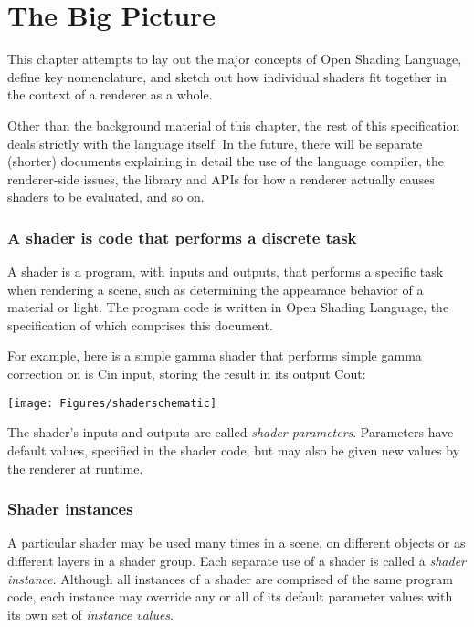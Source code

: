 \documentclass[11pt,letterpaper]{book}
\def\langname{Open Shading Language\xspace}
\begin{document}
\chapter{The Big Picture}
\label{chap:shaderstructure}
\label{chap:bigpicture}

This chapter attempts to lay out the major concepts of \langname,
define key nomenclature, and sketch out how individual shaders fit 
together in the context of a renderer as a whole.

\begin{annotate}
Other than the background material of this chapter, the rest of this
specification deals strictly with the language itself.  In the future, 
there will be separate (shorter) documents explaining in detail the use
of the language compiler, the renderer-side issues, the library and APIs
for how a renderer actually causes shaders to be evaluated, and so on.
\end{annotate}

\subsection*{A shader is code that performs a discrete task}

A shader is a program, with inputs and outputs, that performs a specific
task when rendering a scene, such as determining the appearance behavior
of a material or light.  The program code is written in \langname, the
specification of which comprises this document.

For example, here is a simple {\cf gamma} shader that performs
simple gamma correction on is {\cf Cin} input, storing the result
in its output {\cf Cout}:
\bigskip

\texttt{[image: Figures/shaderschematic]}

\medskip

The shader's inputs and outputs are called \emph{shader parameters}.  
Parameters have default values, specified in the shader code, but may
also be given new values by the renderer at runtime.  

\subsection*{Shader instances}

A particular shader may be used many times in a scene, on different
objects or as different layers in a shader group.  Each separate use of
a shader is called a \emph{shader instance}.  Although all instances of
a shader are comprised of the same program code, each instance may
override any or all of its default parameter values with its own set of
\emph{instance values}.
\end{document}
